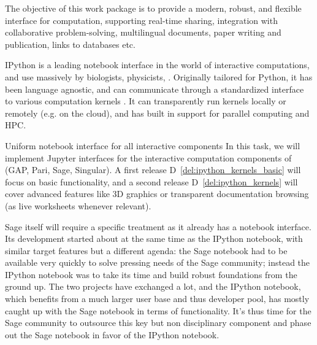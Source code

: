 \addtocounter{wpno}{1}
\begin{Workpackage}{\thewpno}
\WPTitle{\wpname{\thewpno}}

\begin{WPObjectives}
  The objective of this work package is to provide a modern, robust,
  and flexible interface for computation, supporting real-time
  sharing, integration with collaborative problem-solving,
  multilingual documents, paper writing and publication, links to
  databases etc.
\end{WPObjectives}

\begin{WPDescription}


  IPython is a leading notebook interface in the world of interactive
  computations, and use massively by biologists, physicists, . Originally tailored for Python, it has been
  language agnostic, and can communicate through a standardized
  interface to various computation kernels . It can
  transparently run kernels locally or remotely (e.g. on the cloud),
  and has built in support for parallel computing and HPC.
\end{WPDescription}

\begin{task}{Uniform notebook interface for all interactive components}
  In this task, we will implement Jupyter interfaces for the
  interactive computation components of \TheProject (GAP, Pari, Sage,
  Singular). A first release D~\ref{del:ipython_kernels_basic} will
  focus on basic functionality, and a second release
  D~\ref{del:ipython_kernels} will cover advanced features like 3D
  graphics or transparent documentation browsing (as live worksheets
  whenever relevant).

  Sage itself will require a specific treatment as it already has a
  notebook interface. Its development started about at the same time
  as the IPython notebook, with similar target features but a
  different agenda: the Sage notebook had to be available very quickly
  to solve pressing needs of the Sage community; instead the IPython
  notebook was to take its time and build robust foundations from the
  ground up. The two projects have exchanged a lot, and the IPython
  notebook, which benefits from a much larger user base and thus
  developer pool, has mostly caught up with the Sage notebook in terms
  of functionality. It's thus time for the Sage community to outsource
  this key but non disciplinary component and phase out the Sage
  notebook in favor of the IPython notebook.


\end{task}
\end{Workpackage}
